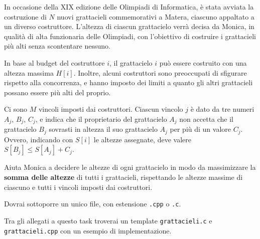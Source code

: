 \usepackage{xcolor}
\usepackage{afterpage}
\usepackage{pifont,mdframed}
\usepackage[bottom]{footmisc}
\usepackage{caption}



\renewcommand{\inputfile}{\texttt{stdin}}
\renewcommand{\outputfile}{\texttt{stdout}}
\makeatletter
\renewcommand{\this@inputfilename}{\texttt{stdin}}
\renewcommand{\this@outputfilename}{\texttt{stdout}}
\makeatother


In occasione della XIX edizione delle Olimpiadi di Informatica, è stata avviata
la costruzione di $N$ nuovi grattacieli commemorativi a Matera, ciascuno
appaltato a un diverso costruttore. L'altezza di ciascun grattacielo verrà
decisa da Monica, in qualità di alta funzionaria delle Olimpiadi, con
l'obiettivo di costruire i grattacieli più alti senza scontentare nessuno.

In base al budget del costruttore $i$, il grattacielo $i$ può essere costruito
con una altezza massima $H[i]$. Inoltre, alcuni costruttori sono preoccupati di
sfigurare rispetto alla concorrenza, e hanno imposto dei limiti a quanto gli
altri grattacieli possano essere più alti del proprio.

Ci sono $M$ vincoli imposti dai costruttori. Ciascun vincolo $j$ è dato da tre
numeri $A_j$, $B_j$, $C_j$, e indica che il proprietario del grattacielo $A_j$
non accetta che il grattacielo $B_j$ sovrasti in altezza il suo grattacielo
$A_j$ per più di un valore $C_j$. Ovvero, indicando con $S[i]$ le altezze assegnate,
deve valere $S[B_j] \leq S[A_j] + C_j$.

Aiuta Monica a decidere le altezze di ogni grattacielo in modo da massimizzare
la \textbf{somma delle altezze} di tutti i grattacieli, rispettando le altezze
massime di ciascuno e tutti i vincoli imposti dai costruttori.


\Implementation

Dovrai sottoporre un unico file, con estensione \texttt{.cpp} o \texttt{.c}.

\begin{warning}
Tra gli allegati a questo task troverai un template \texttt{grattacieli.c} e \texttt{grattacieli.cpp} con un esempio di implementazione.
\end{warning}


